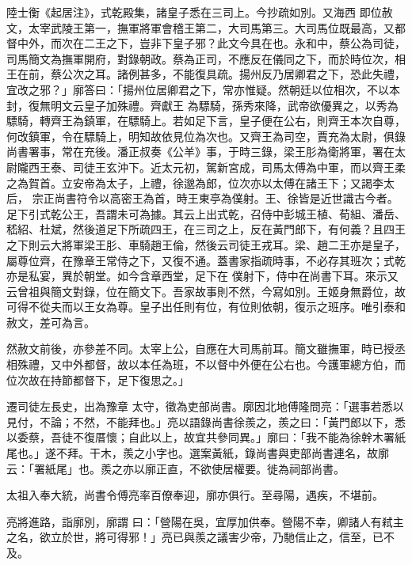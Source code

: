 \begin{pinyinscope}
 陸士衡《起居注》，式乾殿集，諸皇子悉在三司上。今抄疏如別。又海西
 即位赦文，太宰武陵王第一，撫軍將軍會稽王第二，大司馬第三。大司馬位既最高，又都督中外，而次在二王之下，豈非下皇子邪？此文今具在也。永和中，蔡公為司徒，司馬簡文為撫軍開府，對錄朝政。蔡為正司，不應反在儀同之下，而於時位次，相王在前，蔡公次之耳。諸例甚多，不能復具疏。揚州反乃居卿君之下，恐此失禮，宜改之邪？」廓答曰：「揚州位居卿君之下，常亦惟疑。然朝廷以位相次，不以本封，復無明文云皇子加殊禮。齊獻王
 為驃騎，孫秀來降，武帝欲優異之，以秀為驃騎，轉齊王為鎮軍，在驃騎上。若如足下言，皇子便在公右，則齊王本次自尊，何改鎮軍，令在驃騎上，明知故依見位為次也。又齊王為司空，賈充為太尉，俱錄尚書署事，常在充後。潘正叔奏《公羊》事，于時三錄，梁王肜為衛將軍，署在太尉隴西王泰、司徒王玄沖下。近太元初，駕新宮成，司馬太傅為中軍，而以齊王柔之為賀首。立安帝為太子，上禮，徐邈為郎，位次亦以太傅在諸王下；又謁李太后，
 宗正尚書符令以高密王為首，時王東亭為僕射。王、徐皆是近世識古今者。足下引式乾公王，吾謂未可為據。其云上出式乾，召侍中彭城王植、荀組、潘岳、嵇紹、杜斌，然後道足下所疏四王，在三司之上，反在黃門郎下，有何義？且四王之下則云大將軍梁王肜、車騎趙王倫，然後云司徒王戎耳。梁、趙二王亦是皇子，屬尊位齊，在豫章王常侍之下，又復不通。蓋書家指疏時事，不必存其班次；式乾亦是私宴，異於朝堂。如今含章西堂，足下在
 僕射下，侍中在尚書下耳。來示又云曾祖與簡文對錄，位在簡文下。吾家故事則不然，今寫如別。王姬身無爵位，故可得不從夫而以王女為尊。皇子出任則有位，有位則依朝，復示之班序。唯引泰和赦文，差可為言。



 然赦文前後，亦參差不同。太宰上公，自應在大司馬前耳。簡文雖撫軍，時已授丞相殊禮，又中外都督，故以本任為班，不以督中外便在公右也。今護軍總方伯，而位次故在持節都督下，足下復思之。」



 遷司徒左長史，出為豫章
 太守，徵為吏部尚書。廓因北地傅隆問亮：「選事若悉以見付，不論；不然，不能拜也。」亮以語錄尚書徐羨之，羨之曰：「黃門郎以下，悉以委蔡，吾徒不復厝懷；自此以上，故宜共參同異。」廓曰：「我不能為徐幹木署紙尾也。」遂不拜。干木，羨之小字也。選案黃紙，錄尚書與吏部尚書連名，故廓云：「署紙尾」也。羨之亦以廓正直，不欲使居權要。徙為祠部尚書。



 太祖入奉大統，尚書令傅亮率百僚奉迎，廓亦俱行。至尋陽，遇疾，不堪前。



 亮將進路，詣廓別，廓謂
 曰：「營陽在吳，宜厚加供奉。營陽不幸，卿諸人有弒主之名，欲立於世，將可得邪！」亮已與羨之議害少帝，乃馳信止之，信至，已不及。




\end{pinyinscope}
